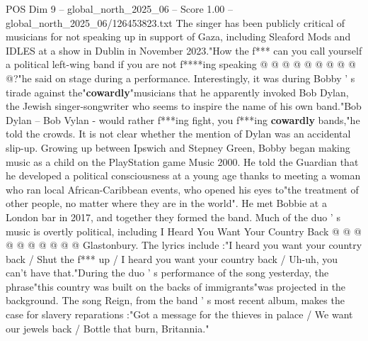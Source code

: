 \begin{textsample}{POS Dim 9 – global\_north\_2025\_06 – Score 1.00 – global\_north\_2025\_06/126453823.txt}
The singer has been publicly critical of musicians for not speaking up in support of Gaza, including Sleaford Mods and IDLES at a show in Dublin in November 2023."How the f*** can you call yourself a political left-wing band if you are not f****ing speaking @ @ @ @ @ @ @ @ @ @?"he said on stage during a performance.
Interestingly, it was during Bobby ' s tirade against the"\textbf{cowardly}"musicians that he apparently invoked Bob Dylan, the Jewish singer-songwriter who seems to inspire the name of his own band."Bob Dylan -- Bob Vylan - would rather f***ing fight, you f***ing \textbf{cowardly} bands,"he told the crowds.
It is not clear whether the mention of Dylan was an accidental slip-up.
Growing up between Ipswich and Stepney Green, Bobby began making music as a child on the PlayStation game Music 2000.
He told the Guardian that he developed a political consciousness at a young age thanks to meeting a woman who ran local African-Caribbean events, who opened his eyes to"the treatment of other people, no matter where they are in the world".
He met Bobbie at a London bar in 2017, and together they formed the band.
Much of the duo ' s music is overtly political, including I Heard You Want Your Country Back @ @ @ @ @ @ @ @ @ @ Glastonbury.
The lyrics include :"I heard you want your country back / Shut the f*** up / I heard you want your country back / Uh-uh, you can't have that."During the duo ' s performance of the song yesterday, the phrase"this country was built on the backs of immigrants"was projected in the background.
The song Reign, from the band ' s most recent album, makes the case for slavery reparations :"Got a message for the thieves in palace / We want our jewels back / Bottle that burn, Britannia."

\end{textsample}
